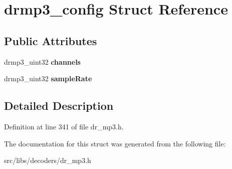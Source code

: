 \hypertarget{structdrmp3__config}{\section{drmp3\-\_\-config Struct Reference}
\label{structdrmp3__config}
}
\subsection*{Public Attributes}
\begin{DoxyCompactItemize}
\item 
\hypertarget{structdrmp3__config_aeba5ee4c2ca6c8b1d4a8174ddd19ac7c}{drmp3\-\_\-uint32 {\bfseries channels}}\label{structdrmp3__config_aeba5ee4c2ca6c8b1d4a8174ddd19ac7c}

\item 
\hypertarget{structdrmp3__config_a97b032abdec484103ad2c2ee74182eb1}{drmp3\-\_\-uint32 {\bfseries sample\-Rate}}\label{structdrmp3__config_a97b032abdec484103ad2c2ee74182eb1}

\end{DoxyCompactItemize}


\subsection{Detailed Description}


Definition at line 341 of file dr\-\_\-mp3.\-h.



The documentation for this struct was generated from the following file\-:\begin{DoxyCompactItemize}
\item 
src/libs/decoders/dr\-\_\-mp3.\-h\end{DoxyCompactItemize}
